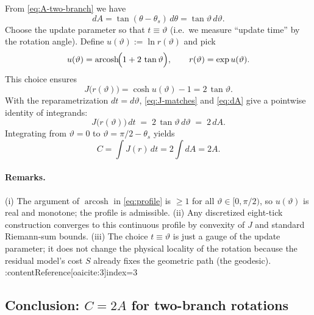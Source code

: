 \documentclass[11pt,letterpaper]{article}
\begin{document}
From \eqref{eq:A-two-branch} we have
\begin{equation}
dA=\tan(\theta-\theta_s)\,d\theta=\tan\vartheta\,d\vartheta.
\label{eq:dA}
\end{equation}
Choose the update parameter so that \(t\equiv\vartheta\) (i.e.\ we measure ``update time'' by the rotation angle). Define \(u(\vartheta):=\ln r(\vartheta)\) and pick
\begin{equation}
u(\vartheta)=\operatorname{arcosh}\!\Bigl(1+2\,\tan\vartheta\Bigr),
\qquad
r(\vartheta)=\exp u(\vartheta).
\label{eq:profile}
\end{equation}
This choice ensures
\begin{equation}
J\!\bigl(r(\vartheta)\bigr)=\cosh u(\vartheta)-1=2\,\tan\vartheta.
\label{eq:J-matches}
\end{equation}
With the reparametrization \(dt=d\vartheta\), \eqref{eq:J-matches} and \eqref{eq:dA} give a pointwise identity of integrands:
\begin{equation}
J\!\bigl(r(\vartheta)\bigr)\,dt\;=\;2\,\tan\vartheta\,d\vartheta\;=\;2\,dA.
\label{eq:pointwise-match}
\end{equation}
Integrating from \(\vartheta=0\) to \(\vartheta=\pi/2-\theta_s\) yields
\begin{equation}
C=\int J(r)\,dt
=2\int dA
=2A.
\label{eq:C-equals-2A}
\end{equation}

\paragraph{Remarks.}
(i) The argument of \(\operatorname{arcosh}\) in \eqref{eq:profile} is \(\ge 1\) for all \(\vartheta\in[0,\pi/2)\), so \(u(\vartheta)\) is real and monotone; the profile is admissible. (ii) Any discretized eight-tick construction converges to this continuous profile by convexity of \(J\) and standard Riemann-sum bounds. (iii) The choice \(t\equiv\vartheta\) is just a gauge of the update parameter; it does not change the physical locality of the rotation because the residual model's cost \(S\) already fixes the geometric path (the geodesic). :contentReference[oaicite:3]{index=3}

\subsection{Conclusion: \(C=2A\) for two-branch rotations}
\end{document}
